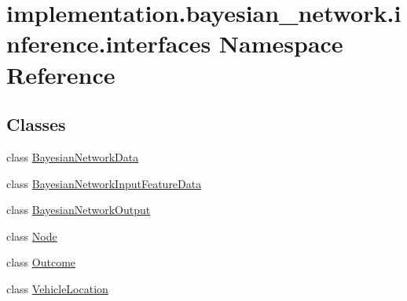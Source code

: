\hypertarget{namespaceimplementation_1_1bayesian__network_1_1inference_1_1interfaces}{}\section{implementation.\+bayesian\+\_\+network.\+inference.\+interfaces Namespace Reference}
\label{namespaceimplementation_1_1bayesian__network_1_1inference_1_1interfaces}
\subsection*{Classes}
\begin{DoxyCompactItemize}
\item 
class \hyperlink{classimplementation_1_1bayesian__network_1_1inference_1_1interfaces_1_1_bayesian_network_data}{Bayesian\+Network\+Data}
\item 
class \hyperlink{classimplementation_1_1bayesian__network_1_1inference_1_1interfaces_1_1_bayesian_network_input_feature_data}{Bayesian\+Network\+Input\+Feature\+Data}
\item 
class \hyperlink{classimplementation_1_1bayesian__network_1_1inference_1_1interfaces_1_1_bayesian_network_output}{Bayesian\+Network\+Output}
\item 
class \hyperlink{classimplementation_1_1bayesian__network_1_1inference_1_1interfaces_1_1_node}{Node}
\item 
class \hyperlink{classimplementation_1_1bayesian__network_1_1inference_1_1interfaces_1_1_outcome}{Outcome}
\item 
class \hyperlink{classimplementation_1_1bayesian__network_1_1inference_1_1interfaces_1_1_vehicle_location}{Vehicle\+Location}
\end{DoxyCompactItemize}
